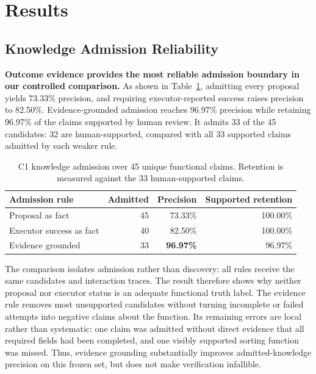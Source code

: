 \section{Results}
\label{sec:results}

\subsection{Knowledge Admission Reliability}

\textbf{Outcome evidence provides the most reliable admission boundary in our
controlled comparison.} As shown in Table~\ref{tab:c1-admission}, admitting
every proposal yields 73.33\% precision, and requiring executor-reported success
raises precision to 82.50\%. Evidence-grounded admission reaches 96.97\%
precision while retaining 96.97\% of the claims supported by human review. It
admits 33 of the 45 candidates: 32 are human-supported, compared with all 33
supported claims admitted by each weaker rule.

\begin{table}[t]
    \centering
    \caption{C1 knowledge admission over 45 unique functional claims. Retention
    is measured against the 33 human-supported claims.}
    \label{tab:c1-admission}
    \small
    \begin{tabular}{lrrr}
        \toprule
        Admission rule & Admitted & Precision & Supported retention \\
        \midrule
        Proposal as fact & 45 & 73.33\% & 100.00\% \\
        Executor success as fact & 40 & 82.50\% & 100.00\% \\
        Evidence grounded & 33 & \textbf{96.97\%} & 96.97\% \\
        \bottomrule
    \end{tabular}
\end{table}

The comparison isolates admission rather than discovery: all rules receive the
same candidates and interaction traces. The result therefore shows why neither
proposal nor executor status is an adequate functional truth label. The
evidence rule removes most unsupported candidates without turning incomplete
or failed attempts into negative claims about the function. Its remaining
errors are local rather than systematic: one claim was admitted without direct
evidence that all required fields had been completed, and one visibly supported
sorting function was missed. Thus, evidence grounding substantially improves
admitted-knowledge precision on this frozen set, but does not make verification
infallible.


